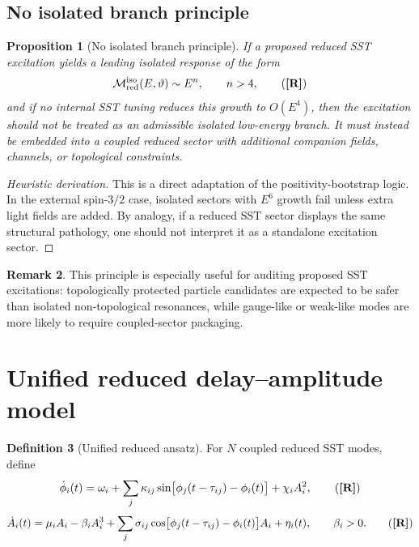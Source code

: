 \documentclass[11pt]{article}
\newcommand{\TagD}{\textbf{[D]}} %
\newcommand{\TagR}{\textbf{[R]}} %
\theoremstyle{definition}
\newtheorem{definition}{Definition}[section]
\newtheorem{remark}[definition]{Remark}
\theoremstyle{plain}
\newtheorem{proposition}[definition]{Proposition}
\begin{document}
\subsection{No isolated branch principle}

\begin{proposition}[No isolated branch principle]
If a proposed reduced SST excitation yields a leading isolated response of the form
\begin{equation}
\mathcal M_{\rm red}^{\rm iso}(E,\vartheta)\sim E^n,
\qquad n>4,
\tag{\TagR}
\label{eq:iso-growth}
\end{equation}
and if no internal SST tuning reduces this growth to \(O(E^4)\), then the excitation should not be treated as an admissible isolated low-energy branch. It must instead be embedded into a coupled reduced sector with additional companion fields, channels, or topological constraints.
\tag{\TagR/\TagD}
\label{prop:noisolated}
\end{proposition}

\begin{proof}[Heuristic derivation]
This is a direct adaptation of the positivity-bootstrap logic. In the external spin-$3/2$ case, isolated sectors with \(E^6\) growth fail unless extra light fields are added. By analogy, if a reduced SST sector displays the same structural pathology, one should not interpret it as a standalone excitation sector.
\end{proof}

\begin{remark}
This principle is especially useful for auditing proposed SST excitations: topologically protected particle candidates are expected to be safer than isolated non-topological resonances, while gauge-like or weak-like modes are more likely to require coupled-sector packaging.
\end{remark}

\section{Unified reduced delay--amplitude model}\label{sec:unified}

\begin{definition}[Unified reduced ansatz]
For \(N\) coupled reduced SST modes, define
\begin{equation}
\dot{\phi}_i(t)
=
\omega_i
+
\sum_j \kappa_{ij}\sin\!\big[\phi_j(t-\tau_{ij})-\phi_i(t)\big]
+
\chi_i A_i^2,
\tag{\TagR}
\label{eq:uphi}
\end{equation}
\begin{equation}
\dot{A}_i(t)
=
\mu_i A_i
-
\beta_i A_i^3
+
\sum_j \sigma_{ij}\cos\!\big[\phi_j(t-\tau_{ij})-\phi_i(t)\big]A_i
+
\eta_i(t),
\qquad \beta_i>0.
\tag{\TagR}
\label{eq:uA}
\end{equation}
\end{definition}
\end{document}
